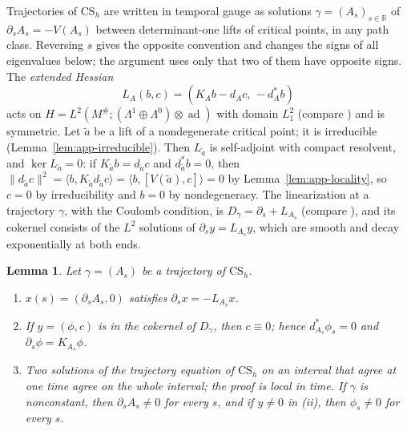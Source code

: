 \documentclass[11pt]{amsart}
\newtheorem{lemma}[theorem]{Lemma}
\theoremstyle{definition}
\theoremstyle{remark}
\theoremstyle{plain}
\numberwithin{equation}{section}
\newcommand{\RR}{\mathbb{R}}
\newcommand{\ad}{\operatorname{ad}}
\begin{document}
Trajectories of $\mathrm{CS}_h$ are written in temporal gauge as solutions
$\gamma=(A_s)_{s\in\RR}$ of $\partial_sA_s=-V(A_s)$ between determinant-one lifts of critical
points, in any path class. Reversing $s$ gives the opposite convention and changes the signs of
all eigenvalues below; the argument uses only that two of them have opposite signs. The
\emph{extended Hessian}
\[
L_A(b,c)=(K_Ab-d_Ac,\,-d_A^*b)
\]
acts on $H=L^2(M^\#;(\Lambda^1\oplus\Lambda^0)\otimes\ad)$ with domain $L^2_1$
(compare \cite[(2.23)]{Donaldson-book}) and is symmetric. Let $\tilde a$ be a lift of a
nondegenerate critical point; it is irreducible (Lemma~\ref{lem:app-irreducible}). Then $L_{\tilde a}$ is self-adjoint with
compact resolvent, and $\ker L_{\tilde a}=0$: if $K_{\tilde a}b=d_{\tilde a}c$ and
$d_{\tilde a}^*b=0$, then $\|d_{\tilde a}c\|^2=\langle b,K_{\tilde a}d_{\tilde a}c\rangle
=\langle b,[V(\tilde a),c]\rangle=0$ by Lemma~\ref{lem:app-locality}, so $c=0$ by
irreducibility and $b=0$ by nondegeneracy. The linearization at a trajectory $\gamma$, with the
Coulomb condition, is $D_\gamma=\partial_s+L_{A_s}$ (compare \cite[Section~3.1]{Donaldson-book}), and its
cokernel consists of the $L^2$ solutions of $\partial_sy=L_{A_s}y$, which are smooth and decay
exponentially at both ends.

\begin{lemma}\label{lem:app-trajectories}
Let $\gamma=(A_s)$ be a trajectory of $\mathrm{CS}_h$.
\begin{enumerate}[label=(\roman*)]
\item $x(s)=(\partial_sA_s,0)$ satisfies $\partial_sx=-L_{A_s}x$.
\item If $y=(\phi,c)$ is in the cokernel of $D_\gamma$, then $c\equiv0$; hence
  $d^*_{A_s}\phi_s=0$ and $\partial_s\phi=K_{A_s}\phi$.
\item Two solutions of the trajectory equation of $\mathrm{CS}_h$ on an interval that agree
  at one time agree on the whole interval; the proof is local in time. If $\gamma$
  is nonconstant, then $\partial_sA_s\ne0$ for every $s$, and if $y\ne0$ in (ii), then
  $\phi_s\ne0$ for every $s$.
\end{enumerate}
\end{lemma}
\end{document}
